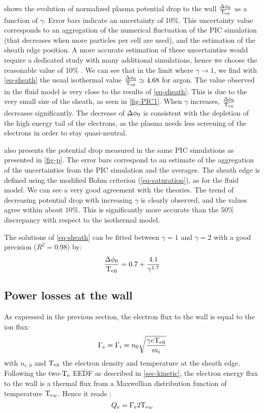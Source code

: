  shows the evolution of normalized plasma potential drop to the wall $\frac{\Delta \phi_0}{\mathrm{T_e}_0}$ as a function of $\gamma$.
{  Error bars indicate an uncertainty of 10\%.
This uncertainty value corresponds to an aggregation of the numerical fluctuation of the PIC simulation (that decreases when more particles per cell are used), and the estimation of the sheath edge position.
A more accurate estimation of these uncertainties would require a dedicated study with many additional simulations, hence we choose the reasonable value of 10\% \citep{turner2013}.}
We can see that in the limit where $\gamma \rightarrow 1$, we find with \cref{eq-sheath} the usual isothermal value $\frac{\Delta \phi_0}{\mathrm{T_e}_0}  \simeq 4.68$ for argon.
The value observed in the fluid model is very close to the results of \cref{eq-sheath}.
This is due to the very small size of the sheath, as seen in \cref{fig-PIC1}.
When $\gamma$ increases, $\frac{\Delta \phi_0}{\mathrm{T_e}_0}$ decreases significantly.
The decrease of $\Delta \phi_0$ is consistent with the depletion of the high energy tail of the electrons, as the plasma needs less screening of the electrons in order to stay quasi-neutral.

 also presents the potential drop measured in the same PIC simulations as presented in \cref{fig-p}.
The error bars correspond to an estimate of the aggregation of the uncertainties from the PIC simulation and the averages.
The sheath edge is defined using the modified Bohm criterion (\cref{eq-saturation}), as for the fluid model.
We can see a very good agreement with the theories.
The trend of decreasing potential drop with increasing $\gamma$ is clearly observed, and the values agree within about $10\%$.
This is significantly more accurate than the $50$\% discrepancy with respect to the isothermal model.

The solutions of \cref{eq-sheath} can be fitted between $\gamma = 1$ and $\gamma = 2$ with a good precision ($R^2 = 0.98$) by:
\begin{equation}
  \label{eq-fit}
  \frac{\Delta \phi_0}{\mathrm{T_e}_0} = 0.7 + \frac{4.1}{\gamma^{1.7}}
\end{equation}

\subsection{Power losses at the wall}

As expressed in the previous section, the electron flux to the wall is equal to the ion flux:
\begin{equation}
  \Gamma_e = \Gamma_i =  n_0 \sqrt{\frac{\gamma e \mathrm{T_e}_0}{m_i}}
\end{equation}
with $n_{e,0}$ and $\mathrm{T_e}_0$ the electron density and temperature at the sheath edge.
Following the two-$\mathrm{T_e}$ EEDF as described in \cref{sec-kinetic}, the electron energy flux to the wall is a thermal flux from a Maxwellian distribution function of temperature  $\mathrm{T_e}_w$.
Hence it reads \cite{chabert2011}:
\begin{equation}
  \label{eq-maxflux}
  Q_e = \Gamma_e 2 \mathrm{T_e}_{w}
\end{equation}


